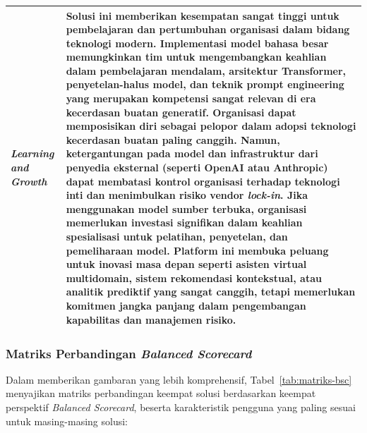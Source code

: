\begin{longtable}{|p{3.5cm}|p{9cm}|}
\textit{Learning and Growth} & Solusi ini memberikan kesempatan sangat tinggi untuk pembelajaran dan pertumbuhan organisasi dalam bidang teknologi modern. Implementasi model bahasa besar memungkinkan tim untuk mengembangkan keahlian dalam pembelajaran mendalam, arsitektur Transformer, penyetelan-halus model, dan teknik prompt engineering yang merupakan kompetensi sangat relevan di era kecerdasan buatan generatif. Organisasi dapat memposisikan diri sebagai pelopor dalam adopsi teknologi kecerdasan buatan paling canggih. Namun, ketergantungan pada model dan infrastruktur dari penyedia eksternal (seperti OpenAI atau Anthropic) dapat membatasi kontrol organisasi terhadap teknologi inti dan menimbulkan risiko vendor \textit{lock-in}. Jika menggunakan model sumber terbuka, organisasi memerlukan investasi signifikan dalam keahlian spesialisasi untuk pelatihan, penyetelan, dan pemeliharaan model. Platform ini membuka peluang untuk inovasi masa depan seperti asisten virtual multidomain, sistem rekomendasi kontekstual, atau analitik prediktif yang sangat canggih, tetapi memerlukan komitmen jangka panjang dalam pengembangan kapabilitas dan manajemen risiko. \\
\hline

\end{longtable}

\subsubsection{Matriks Perbandingan \textit{Balanced Scorecard}}

Dalam memberikan gambaran yang lebih komprehensif, Tabel~\ref{tab:matriks-bsc} menyajikan matriks perbandingan keempat solusi berdasarkan keempat perspektif \textit{Balanced Scorecard}, beserta karakteristik pengguna yang paling sesuai untuk masing-masing solusi:

